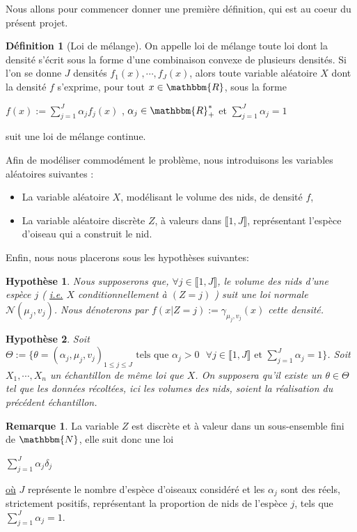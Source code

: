 \documentclass[frenchb]{report}
\newcommand{\R}{\mathbbm{R}}
\newcommand{\N}{\mathbbm{N}}
\newcommand{\1}{\mathbbm{1}}
\newcommand{\n}{\mathcal{N}}
\newtheorem{hyp}{Hypothèse}
\theoremstyle{definition}\newtheorem{defn}{Définition}
\theoremstyle{definition}\newtheorem{exm}{Exemple}
\theoremstyle{definition}\newtheorem{nota}{Notation}
\theoremstyle{definition}\newtheorem{rem}{Remarque}
\begin{document}
Nous allons pour commencer donner une première définition, qui est au coeur du présent projet.

\begin{defn}[Loi de mélange]
On appelle loi de mélange toute loi dont la densité s'écrit sous la forme d'une combinaison convexe de plusieurs densités. Si l'on se donne $J$  densités $f_1(x), \cdots, f_J(x)$, alors toute variable aléatoire $X$ dont la densité $f$ s'exprime, pour tout $x\in\R$, sous la forme
\begin{center}
$f(x) := \displaystyle\sum_{j=1}^J \alpha_j f_j(x)$ , $\alpha_j \in\R_+^*$ et $\displaystyle\sum_{j=1}^J\alpha_j=1$ \end{center}
suit une loi de mélange continue.
\end{defn}

Afin de modéliser commodément le problème, nous introduisons les variables aléatoires suivantes :

\begin{itemize}[label=\adfflowerleft]
	\item La variable aléatoire $X$, modélisant le volume des nids, de densité $f$,
	\item La variable aléatoire discrète $Z$, à valeurs dans $\llbracket 1,J\rrbracket$, représentant l'espèce d'oiseau qui a construit le nid.
\end{itemize}

Enfin, nous nous placerons sous les hypothèses suivantes:

\begin{hyp}
Nous supposerons que, $\forall j\in \llbracket 1,J \rrbracket$, le volume des nids d'une espèce $j$ ( \underline{i.e.} $X$ conditionnellement à $(Z=j)$ ) suit une loi normale $\n(\mu_j,v_j)$. Nous dénoterons par $f(x | Z = j) := \gamma_{\mu_j, v_j}(x)$ cette densité.
\end{hyp}


\begin{hyp}
Soit $\Theta := \{ \theta = (\alpha_j,\mu_j, v_j)_{1 \leq j \leq J} \text{ tels que } \alpha_j > 0 \text{ } \forall j\in \llbracket 1,J\rrbracket \text{ et } \displaystyle\sum_{j=1}^J\alpha_j=1\}$. Soit $X_1, \cdots, X_n$ un échantillon de même loi que $X$. On supposera qu'il existe un $\theta \in \Theta$ tel que les données récoltées, ici les volumes des nids, soient la réalisation du précédent échantillon.
\end{hyp}

\begin{rem}
La variable $Z$ est discrète et à valeur dans un sous-ensemble fini de $\N$, elle suit donc une loi 
\begin{center} $\displaystyle \sum_{j=1}^J \alpha_j\delta_j$ \end{center}
\underline{où} $J$ représente le nombre d'espèce d'oiseaux considéré et les $\alpha_j$ sont des réels, strictement positifs, représentant la proportion de nids de l'espèce $j$, tels que $\displaystyle\sum_{j=1}^J \alpha_j = 1$.
\end{rem}
\end{document}

